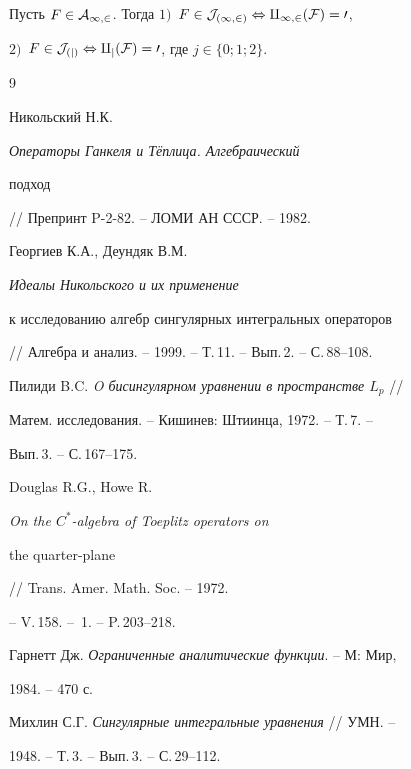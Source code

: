  


\begin{thm} 


Пусть $F\in\cal A_{1,2}$. Тогда $1)$~$F\in\cal J_{(1,2)}\Leftrightarrow 


q_{1,2}(F)=0$, 


$2)$~$F\in\cal J_{(j)}\Leftrightarrow q_j(F)=0$, где $j\in\{0;1;2\}$. 


\end{thm} 


 


 


\begin{thebibliography}{9} 


 




Никольский Н.К. {\em Операторы Ганкеля и Т\"еплица. Алгебраический 


подход} // Препринт P-2-82. -- ЛОМИ АН СССР. -- 1982.




Георгиев К.А., Деундяк В.М. {\em Идеалы Никольского и их применение 


к исследованию алгебр сингулярных интегральных операторов} 


// Алгебра и анализ. -- 1999. -- Т.\,11. -- Вып.\,2. -- С.\,88--108. 




Пилиди B.C. {\em O бисингулярном уравнении в пространстве $L_p$} // 


Матем. исследования. -- Кишинев: Штиинца, 1972. -- Т.\,7. -- 


Вып.\,3. -- С.\,167--175. 




Douglas R.G., Howe R. {\em On the $C^*$-algebra of Toeplitz operators on 


the quarter-plane} // Trans. Amer. Math. Soc. -- 1972. 


-- V.\,158. -- \No\,1. -- P.\,203--218. 




Гарнетт Дж. {\em Ограниченные аналитические функции}. -- М: Мир, 


1984. -- 470 с. 




Михлин С.Г. {\em Сингулярные интегральные уравнения} // УМН. -- 


1948. -- Т.\,3. -- Вып.\,3. -- С.\,29--112. 



\end{thebibliography}
